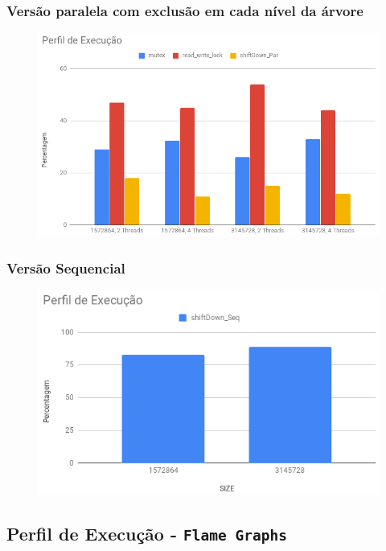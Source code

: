 \documentclass{article}
\begin{document}
\subsubsection{Versão paralela com exclusão em cada nível da árvore}
\begin{figure}[H]
    \centering
    \includegraphics[width=15cm]{Pictures/ExecProfile_Level.png}
    \label{fig:execprofile_level}
\end{figure}

\subsubsection{Versão Sequencial}
\begin{figure}[H]
    \centering
    \includegraphics[width=15cm]{Pictures/ExecProfile_Seq.png}
    \label{fig:execprofile_seq}
\end{figure}

\subsection{Perfil de Execução - \texttt{Flame Graphs}}
\end{document}
